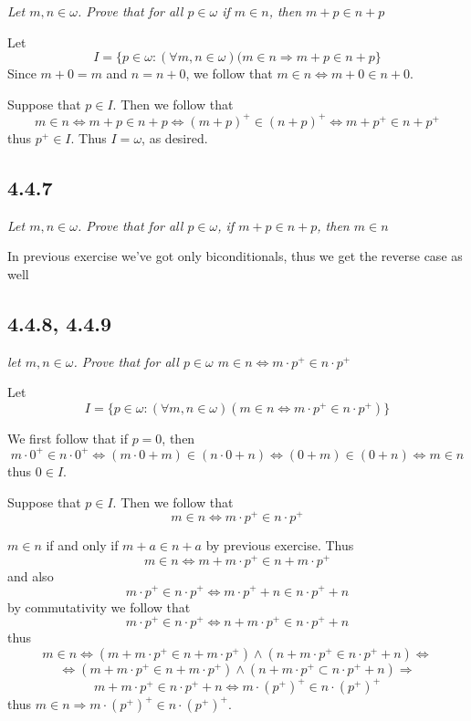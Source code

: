 \documentclass[11pt,oneside,titlepage]{book}
\DeclareMathOperator \lra {\Leftrightarrow}
\DeclareMathOperator \ra {\Rightarrow}
\begin{document}
\textit{Let $m, n \in \omega$. Prove that for all $p \in \omega$ if $m \in n$, then
  $m + p \in n + p$}

Let
$$I = \{p \in \omega: (\forall m, n \in \omega)(m \in n \ra m + p \in n + p\}$$
Since $m + 0 = m$ and $n = n + 0$, we follow that $m \in n \lra m + 0 \in n + 0$.

Suppose that $p \in I$. Then we follow that
$$m \in n \lra m + p \in n + p \lra (m + p)^+ \in (n + p)^+ \lra m + p^+ \in n + p^+$$
thus $p^+ \in I$. Thus $I = \omega$, as desired.

\subsection*{4.4.7}

\textit{Let $m, n \in \omega$. Prove that for all $p \in \omega$, if $m + p \in n + p$, then
  $m \in n$}

In previous exercise we've got only biconditionals, thus we get the reverse case as well

\subsection*{4.4.8, 4.4.9}

\textit{let $m, n \in \omega$. Prove that for all $p \in \omega$ $m \in n \lra
  m \cdot p^+ \in n \cdot p^+$}

Let
$$I = \{p \in \omega: (\forall m, n \in \omega)( m \in n \lra  m \cdot p^+ \in n \cdot p^+)\}$$

We first follow that if $p = 0$, then
$$m \cdot 0^+ \in n \cdot 0^+ \lra (m \cdot 0 + m) \in (n \cdot 0 + n) \lra (0 + m) \in (0 + n)
\lra m \in n$$
thus $0 \in I$.

Suppose that $p \in I$. Then we follow that
$$m \in n \lra m \cdot p^+ \in n \cdot p^+$$

$m \in n$ if and only if $m + a \in n + a$ by previous exercise. Thus
$$m \in n \lra m + m \cdot p^+ \in n + m \cdot p^+$$
and also
$$ m \cdot p^+ \in n \cdot p^+ \lra  m \cdot p^+ + n \in n \cdot p^+  + n$$
by commutativity we follow that
$$ m \cdot p^+ \in n \cdot p^+ \lra  n + m \cdot p^+ \in n \cdot p^+  + n$$
thus
$$m \in n \lra (m + m \cdot p^+ \in n + m \cdot p^+) \land (n + m \cdot p^+ \in n \cdot p^+  + n)
\lra$$
$$\lra (m + m \cdot p^+ \in n + m \cdot p^+) \land
(n + m \cdot p^+ \subset n \cdot p^+  + n) \ra$$
$$ m + m \cdot p^+ \in n \cdot p^+  + n \lra m \cdot (p^+)^+ \in n \cdot (p^+)^+$$
thus $m \in n \ra m \cdot (p^+)^+ \in n \cdot (p^+)^+$.
\end{document}

